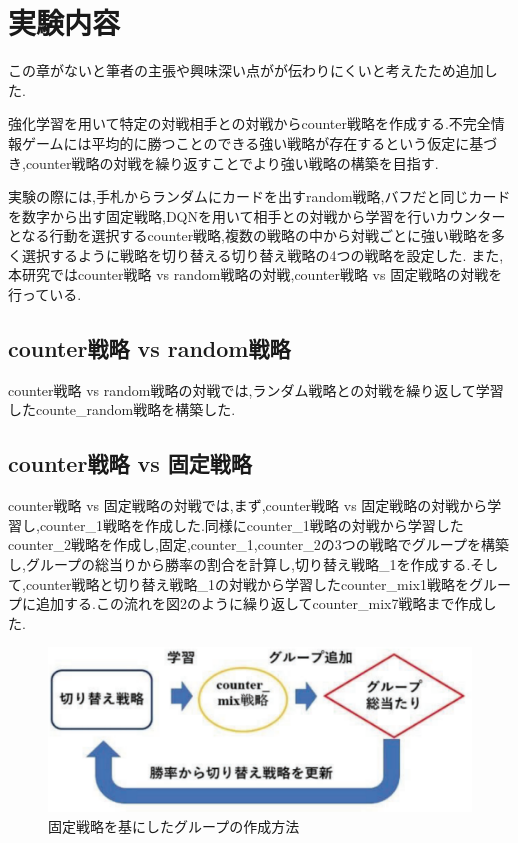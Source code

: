 \documentclass{jarticle}     %
\begin{document}
\section*{実験内容}
この章がないと筆者の主張や興味深い点がが伝わりにくいと考えたため追加した.\par
強化学習を用いて特定の対戦相手との対戦からcounter戦略を作成する.不完全情報ゲームには平均的に勝つことのできる強い戦略が存在するという仮定に基づき,counter戦略の対戦を繰り返すことでより強い戦略の構築を目指す.\par
実験の際には,手札からランダムにカードを出すrandom戦略,バフだと同じカードを数字から出す固定戦略,DQNを用いて相手との対戦から学習を行いカウンターとなる行動を選択するcounter戦略,複数の戦略の中から対戦ごとに強い戦略を多く選択するように戦略を切り替える切り替え戦略の4つの戦略を設定した.
また,本研究ではcounter戦略 vs random戦略の対戦,counter戦略 vs 固定戦略の対戦を行っている.\par

\subsection*{counter戦略 vs random戦略}
counter戦略 vs random戦略の対戦では,ランダム戦略との対戦を繰り返して学習したcounte\_random戦略を構築した.

\subsection*{counter戦略 vs 固定戦略}
counter戦略 vs 固定戦略の対戦では,まず,counter戦略 vs 固定戦略の対戦から学習し,counter\_1戦略を作成した.同様にcounter\_1戦略の対戦から学習したcounter\_2戦略を作成し,固定,counter\_1,counter\_2の3つの戦略でグループを構築し,グループの総当りから勝率の割合を計算し,切り替え戦略\_1を作成する.そして,counter戦略と切り替え戦略\_1の対戦から学習したcounter\_mix1戦略をグループに追加する.この流れを図2のように繰り返してcounter\_mix7戦略まで作成した.

\begin{figure}[ht]
  \centering
  \includegraphics[width=120mm]{assets/Figure2.eps}
  \caption{固定戦略を基にしたグループの作成方法}
  \label{fig:GameFlow of HAGETAKA}
\end{figure}
\end{document}
